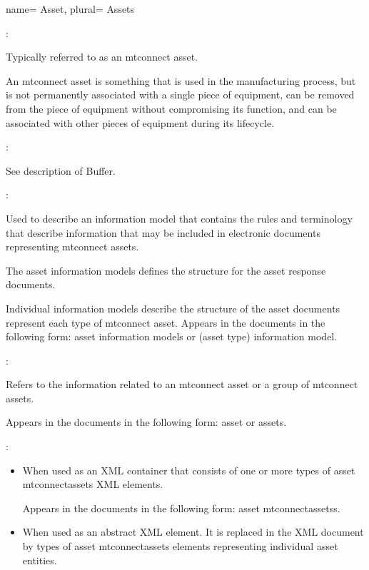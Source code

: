 {
  name= {Asset},
  plural= {Assets}
}
{
  :

  Typically referred to as an \gls{mtconnect asset}.

  An \gls{mtconnect asset} is something that is used in the manufacturing process, but is not permanently associated with a single piece of equipment, can be removed from the piece of equipment without compromising its function, and can be associated with other pieces of equipment during its lifecycle.

  :

  See description of Buffer.

  :

  Used to describe an \gls{information model} that contains the rules and terminology that describe information that may be included in electronic documents representing \glspl{mtconnect asset}.

  The \glspl{asset information model} defines the structure for the \glspl{asset response document}.

  Individual \glspl{information model} describe the structure of the \glspl{asset document} represent each type of \gls{mtconnect asset}. Appears in the documents in the following form: \glspl{asset information model} or (asset type) \gls{information model}.
  
  :

  Refers to the information related to an \gls{mtconnect asset} or a group of \glspl{mtconnect asset}.

  Appears in the documents in the following form: \gls{asset} or \glspl{asset}.

  :

  \begin{itemize}
      \item When used as an XML container that consists of one or more types of \gls{asset mtconnectassets} XML elements.
      
      Appears in the documents in the following form: \glspl{asset mtconnectassets}.
      
      \item When used as an abstract XML element. It is replaced in the XML document by types of \gls{asset mtconnectassets} elements representing individual \gls{asset} entities.
      

\end{itemize}}

